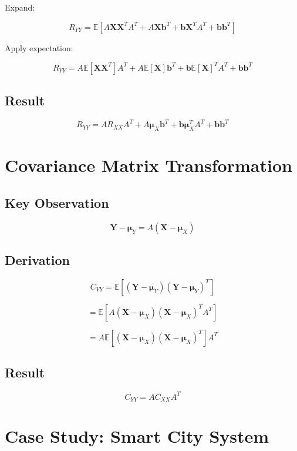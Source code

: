 \documentclass[11pt]{article}
\begin{document}
Expand:

\[
R_{YY} =
\mathbb{E}[A\mathbf{X}\mathbf{X}^T A^T + A\mathbf{X}\mathbf{b}^T + \mathbf{b}\mathbf{X}^T A^T + \mathbf{b}\mathbf{b}^T]
\]

Apply expectation:

\[
R_{YY} =
A\mathbb{E}[\mathbf{X}\mathbf{X}^T]A^T
+ A\mathbb{E}[\mathbf{X}]\mathbf{b}^T
+ \mathbf{b}\mathbb{E}[\mathbf{X}]^T A^T
+ \mathbf{b}\mathbf{b}^T
\]

\subsection{Result}

\[
\boxed{
R_{YY} = A R_{XX} A^T + A \boldsymbol{\mu}_X \mathbf{b}^T + \mathbf{b} \boldsymbol{\mu}_X^T A^T + \mathbf{b}\mathbf{b}^T
}
\]

\section{Covariance Matrix Transformation}

\subsection{Key Observation}

\[
\mathbf{Y} - \boldsymbol{\mu}_Y = A(\mathbf{X} - \boldsymbol{\mu}_X)
\]

\subsection{Derivation}

\[
C_{YY} = \mathbb{E}[(\mathbf{Y} - \boldsymbol{\mu}_Y)(\mathbf{Y} - \boldsymbol{\mu}_Y)^T]
\]

\[
= \mathbb{E}[A(\mathbf{X} - \boldsymbol{\mu}_X)(\mathbf{X} - \boldsymbol{\mu}_X)^T A^T]
\]

\[
= A \mathbb{E}[(\mathbf{X} - \boldsymbol{\mu}_X)(\mathbf{X} - \boldsymbol{\mu}_X)^T] A^T
\]

\subsection{Result}

\[
\boxed{C_{YY} = A C_{XX} A^T}
\]

\section{Case Study: Smart City System}
\end{document}
